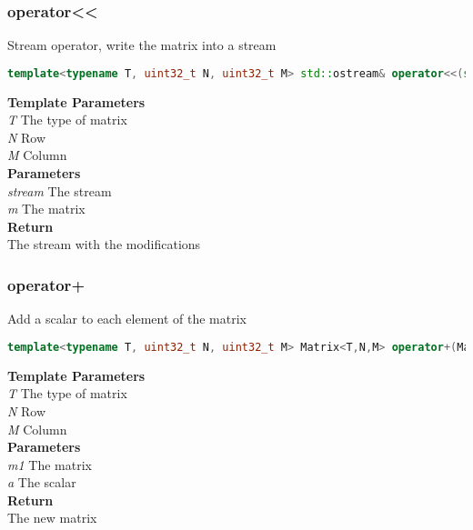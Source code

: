 \subsubsection{operator<<}
\begin{mdframed}
Stream operator, write the matrix into a stream
\begin{lstlisting}[language=C++]
template<typename T, uint32_t N, uint32_t M> std::ostream& operator<<(std::ostream& stream, const Matrix<T,N,M>& m) 
\end{lstlisting}
\textbf{Template Parameters} \\ 
\textit{T} The type of matrix \\ 
\textit{N} Row \\ 
\textit{M} Column \\ 
\textbf{Parameters} \\ 
\textit{stream} The stream \\ 
\textit{m} The matrix \\ 
\textbf{Return} \\ 
The stream with the modifications\\ 
\end{mdframed}

\subsubsection{operator+}
\begin{mdframed}
Add a scalar to each element of the matrix
\begin{lstlisting}[language=C++]
template<typename T, uint32_t N, uint32_t M> Matrix<T,N,M> operator+(Matrix<T,N,M> m1, T a) 
\end{lstlisting}
\textbf{Template Parameters} \\ 
\textit{T} The type of matrix \\ 
\textit{N} Row \\ 
\textit{M} Column \\ 
\textbf{Parameters} \\ 
\textit{m1} The matrix \\ 
\textit{a} The scalar \\ 
\textbf{Return} \\ 
The new matrix\\ 
\end{mdframed}

